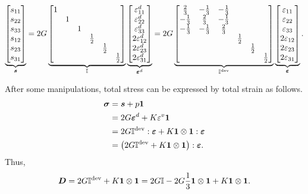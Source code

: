 \begin{gather}\label{eq:dev_tensor_se}
\underbrace{\begin{bmatrix}
s_{11}\\
s_{22}\\
s_{33}\\
s_{12}\\
s_{23}\\
s_{31}
\end{bmatrix}}_{\bm{s}}
=
2G\underbrace{\begin{bmatrix}
1&&&&&\\
&1&&&&\\
&&1&&&\\
&&&\frac{1}{2}&&\\
&&&&\frac{1}{2}&\\
&&&&&\frac{1}{2}
\end{bmatrix}}_{\mathbb{I}}
\underbrace{\begin{bmatrix}
\varepsilon^d_{11}\\
\varepsilon^d_{22}\\
\varepsilon^d_{33}\\
2\varepsilon^d_{12}\\
2\varepsilon^d_{23}\\
2\varepsilon^d_{31}
\end{bmatrix}}_{\bm{\varepsilon}^d}
=
2G\underbrace{\begin{bmatrix}
\frac{2}{3}&-\frac{1}{3}&-\frac{1}{3}&&&\\
-\frac{1}{3}&\frac{2}{3}&-\frac{1}{3}&&&\\
-\frac{1}{3}&-\frac{1}{3}&\frac{2}{3}&&&\\
&&&\frac{1}{2}&&\\
&&&&\frac{1}{2}&\\
&&&&&\frac{1}{2}
\end{bmatrix}}_{\mathbb{I^\text{dev}}}
\underbrace{\begin{bmatrix}
\varepsilon_{11}\\
\varepsilon_{22}\\
\varepsilon_{33}\\
2\varepsilon_{12}\\
2\varepsilon_{23}\\
2\varepsilon_{31}
\end{bmatrix}}_{\bm{\varepsilon}}.
\end{gather}

After some manipulations, total stress can be expressed by total strain as follows.
\begin{gather}
\begin{split}
\bm{\sigma}&=\bm{s}+p\bm{1}\\
&=2G\bm{\varepsilon}^d+K\varepsilon^v\bm{1}\\
&=2G\mathbb{I}^\text{dev}:\bm{\varepsilon}+K\bm{1}\otimes\bm{1}:\bm{\varepsilon}\\
&=\left(2G\mathbb{I}^\text{dev}+K\bm{1}\otimes\bm{1}\right):\bm{\varepsilon}.
\end{split}
\end{gather}
Thus,
\begin{gather}
\bm{D}=2G\mathbb{I}^\text{dev}+K\bm{1}\otimes\bm{1}=2G\mathbb{I}-2G\dfrac{1}{3}\bm{1}\otimes\bm{1}+K\bm{1}\otimes\bm{1}.
\end{gather}

